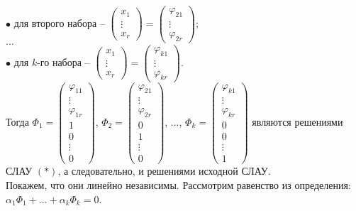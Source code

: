 \documentclass[11pt,a4paper]{article}
\begin{document}
$\bullet$ для второго набора --
$\left( \begin{matrix}
x_1 \\
\vdots \\
x_r
\end{matrix} \right) =
\left( \begin{matrix}
\varphi_{21} \\
\vdots \\
\varphi_{2r}
\end{matrix} \right)$;\\
$\hdots$\\
$\bullet$ для $k$-го набора --
$\left( \begin{matrix}
x_1 \\
\vdots \\
x_r
\end{matrix} \right) =
\left( \begin{matrix}
\varphi_{k1} \\
\vdots \\
\varphi_{kr}
\end{matrix} \right)$.\\
Тогда $\Phi_1 =
\left( \begin{matrix}
\varphi_{11} \\
\vdots \\
\varphi_{1r} \\
1 \\
0 \\
\vdots \\
0 
\end{matrix} \right)$,
$\Phi_2 = \left( \begin{matrix}
\varphi_{21} \\
\vdots \\
\varphi_{2r} \\
0 \\
1 \\
\vdots \\
0
\end{matrix} \right)$,
$\hdots$,
$\Phi_k = \left( \begin{matrix}
\varphi_{k1} \\
\vdots \\
\varphi_{kr} \\
0 \\
0 \\
\vdots \\
1
\end{matrix} \right)$
являются решениями СЛАУ $(*)$, а следовательно, и решениями исходной СЛАУ.\\
Покажем, что они линейно независимы. Рассмотрим равенство из определения: $\alpha_1 \Phi_1 + \hdots + \alpha_k \Phi_k = 0$.\\
\end{document}
